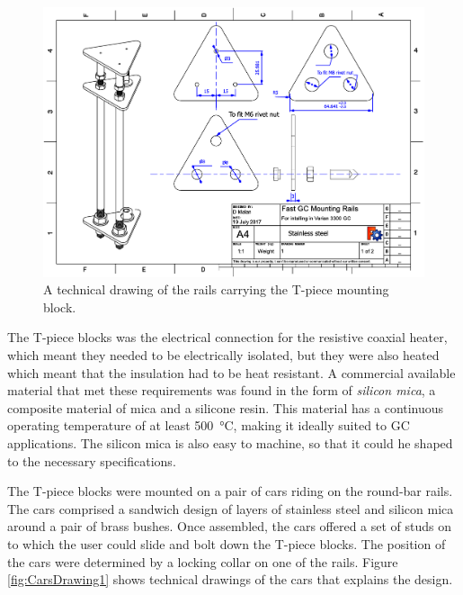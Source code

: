 \begin{figure}
	\centering
	\includegraphics[angle=90, origin=c, scale=0.75]{Figures/RailsDrawing.pdf}
	\decoRule	
\caption[Technical drawing of coaxial heater mounting rails]{\label{fig:RailsDrawing}A technical drawing of the rails carrying the T-piece mounting block.} 
	
\end{figure}

The T-piece blocks was the electrical connection for the resistive coaxial heater,
which meant they needed to be electrically isolated, but they were also heated
which meant that the insulation had to be heat resistant. A commercial available
material that met these requirements was found in the form of \textit{silicon
mica}, a composite material of mica and a silicone resin. This material has a
continuous operating temperature of at least \SI{500}{\celsius}, making it
ideally suited to GC applications. The silicon mica is also easy to machine, so
that it could he shaped to the necessary specifications.

The T-piece blocks were mounted on a pair of cars riding on the round-bar rails.
The cars comprised a sandwich design of layers of stainless steel and silicon
mica around a pair of brass bushes. Once assembled, the cars offered a set of
studs on to which the user could slide and bolt down the T-piece blocks. The
position of the cars were determined by a locking collar on one of the rails.
Figure \ref{fig:CarsDrawing1} shows technical drawings of the cars that explains
the design.

